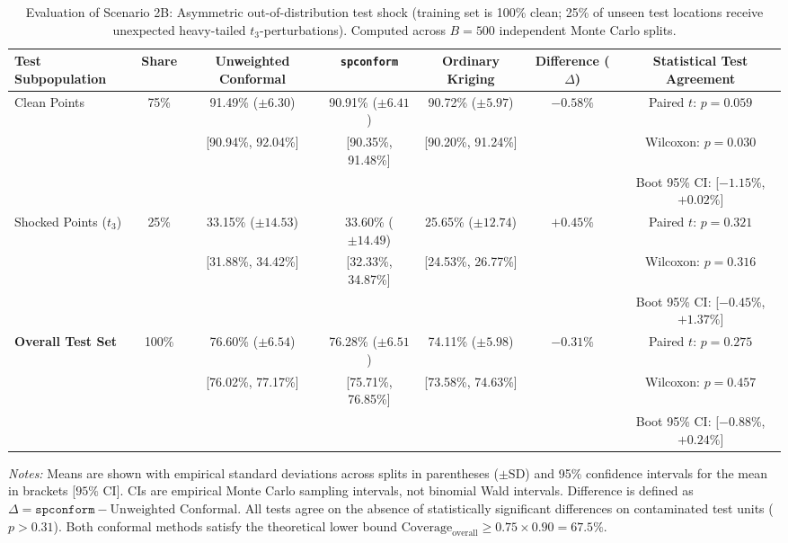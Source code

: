 \documentclass[11pt,a4paper]{article}
\begin{document}
\begin{table}[htbp]
\centering
\small
\begin{threeparttable}
\caption{Evaluation of Scenario 2B: Asymmetric out-of-distribution test shock (training set is 100\% clean; 25\% of unseen test locations receive unexpected heavy-tailed $t_3$-perturbations). Computed across $B = 500$ independent Monte Carlo splits.}
\label{tab:asymmetric_shock_500splits}
\begin{tabular}{lcccccc}
\toprule
\textbf{Test Subpopulation} & \textbf{Share} & \textbf{Unweighted Conformal} & \textbf{\texttt{spconform}} & \textbf{Ordinary Kriging} & \textbf{Difference ($\Delta$)} & \textbf{Statistical Test Agreement} \\
\midrule
Clean Points & 75\% & 91.49\% ($\pm 6.30$) & 90.91\% ($\pm 6.41$) & 90.72\% ($\pm 5.97$) & $-0.58\%$ & Paired $t$: $p = 0.059$ \\
 & & [90.94\%, 92.04\%] & [90.35\%, 91.48\%] & [90.20\%, 91.24\%] & & Wilcoxon: $p = 0.030$ \\
 & & & & & & Boot 95\% CI: [$-1.15$\%, $+0.02$\%] \\
\midrule
Shocked Points ($t_3$) & 25\% & 33.15\% ($\pm 14.53$) & 33.60\% ($\pm 14.49$) & 25.65\% ($\pm 12.74$) & $+0.45\%$ & Paired $t$: $p = 0.321$ \\
 & & [31.88\%, 34.42\%] & [32.33\%, 34.87\%] & [24.53\%, 26.77\%] & & Wilcoxon: $p = 0.316$ \\
 & & & & & & Boot 95\% CI: [$-0.45$\%, $+1.37$\%] \\
\midrule
\textbf{Overall Test Set} & 100\% & 76.60\% ($\pm 6.54$) & 76.28\% ($\pm 6.51$) & 74.11\% ($\pm 5.98$) & $-0.31\%$ & Paired $t$: $p = 0.275$ \\
 & & [76.02\%, 77.17\%] & [75.71\%, 76.85\%] & [73.58\%, 74.63\%] & & Wilcoxon: $p = 0.457$ \\
 & & & & & & Boot 95\% CI: [$-0.88$\%, $+0.24$\%] \\
\bottomrule
\end{tabular}
\begin{tablenotes}[flushleft]
\footnotesize
\item \textit{Notes:} Means are shown with empirical standard deviations across splits in parentheses ($\pm\text{SD}$) and 95\% confidence intervals for the mean in brackets [$95\%\text{ CI}$]. CIs are empirical Monte Carlo sampling intervals, not binomial Wald intervals. Difference is defined as $\Delta = \texttt{spconform} - \text{Unweighted Conformal}$. All tests agree on the absence of statistically significant differences on contaminated test units ($p > 0.31$). Both conformal methods satisfy the theoretical lower bound $\text{Coverage}_{\text{overall}} \ge 0.75 \times 0.90 = 67.5\%$.
\end{tablenotes}
\end{threeparttable}
\end{table}
\end{document}
